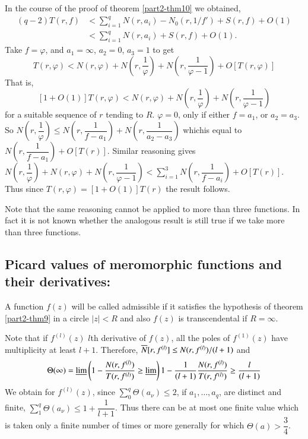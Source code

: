 In the course of the proof of theorem \ref{part2-thm10} we obtained,
\begin{align*}
(q-2)T(r,f) &< \sum^{q}_{i=1}N(r,a_{i})-N_{0}(r,1/f')+S(r,f)+O(1)\\
&< \sum^{q}_{i=1}N(r,a_{i})+S(r,f)+O(1).
\end{align*}
Take $f=\varphi$, and $a_{1}=\infty$, $a_{2}=0$, $a_{3}=1$ to get
$$
T(r,\varphi)<N(r,\varphi) + N\left(r,\frac{1}{\varphi}\right) +
N\left(r,\dfrac{1}{\varphi-1}\right)+O[T(r,\varphi)]  
$$
That is,
$$ 
[1+O(1)] T(r,\varphi)<N(r,\varphi) + N\left(r,\frac{1}{\varphi}\right)
+ N\left(r,\frac{1}{\varphi-1}\right) 
$$
for a suitable sequence of $r$ tending to $R$. \; $\varphi=0$, only if
either $f=a_{1}$, or $a_{2}=a_{3}$. So
$N\left(r,\dfrac{1}{\varphi}\right)\leq
N\left(r,\dfrac{1}{f-a_{1}}\right)+N\left(r,\dfrac{1}{a_{2}-a_{3}}\right)$
which\pageoriginale is equal to
$N\left(r,\dfrac{1}{f-a_{1}}\right)+O[T(r)]$. Similar reasoning gives
$N\left(r,\dfrac{1}{\varphi}\right)+N(r,\varphi)+N\left(r,\dfrac{1}{\varphi-1}\right)<\sum\limits^{3}_{i=1}N\left(r,\dfrac{1}{f-a_{i}}\right)+O[T(r)]$. Thus
since $T(r,\varphi)=[1+O(1)]T(r)$ the result follows.

\begin{remark*}
Note that the same reasoning cannot be applied to more than three
functions. In fact it is not known whether the analogous result is
still true if we take more than three functions. 
\end{remark*}

\subsection[Picard values of meromorphic...]{Picard values of meromorphic functions and their
  derivatives:}\label{part2-sec2.5}\pageoriginale 

A function $f(z)$ will be called admissible if it satisfies the
hypothesis of theorem \ref{part2-thm9} in a circle $|z|<R$ and also
$f(z)$ is transcendental if $R=\infty$.

Note that if $f^{(l)}(z)$ $l$th derivative of $f(z)$, all the poles of
$f^{(1)}(z)$ have multiplicity at least $l+1$. Therefore,
$\overline{N}[r,f^{(l)}]\leq N(r,f^{(l)})/(l+1)$ and 
$$
\Theta(\infty)=\underline{\lim}\left(1-\frac{N(r,f^{(l)})}{T(r,f^{(l)})}\geq
\underline{\lim} \right)
1-\frac{1}{(l+1)}\frac{N(r,f^{(l)})}{T(r,f^{(l)})}\geq \frac{l}{(l+1)} 
$$
We obtain for $f^{(l)}(z)$, since
$\sum\limits^{q}_{0}\Theta(a_{\nu})\leq 2$, if $a_{1},\ldots,a_{q}$,
are distinct and finite, $\sum\limits^{q}_{1}\Theta(a_{\nu})\leq
1+\dfrac{1}{l+1}$. Thus there can be at most one finite value which is
taken only a finite number of times or more generally for which
$\Theta(a)>\dfrac{3}{4}$. 

